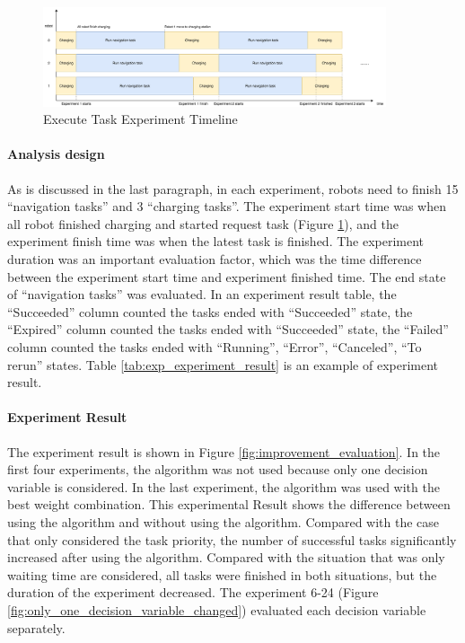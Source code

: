 \begin{figure}[htbp]
 \centering
 \includegraphics[width = 0.9\textwidth]{content/images/ch5/exe_exp_timeline.drawio.png}
 \caption{Execute Task Experiment Timeline}
 \label{fig:execute_task_experiment_timeline}
\end{figure}


\paragraph{Analysis design}
As is discussed in the last paragraph, in each experiment, robots need to finish 15 ``navigation tasks'' and 3 ``charging tasks''.
The experiment start time was when all robot finished charging and started request task (Figure \ref{fig:execute_task_experiment_timeline}), and the experiment finish time was when the latest task is finished.
The experiment duration was an important evaluation factor, which was the time difference between the experiment start time and experiment finished time. 
The end state of ``navigation tasks'' was evaluated. In an experiment result table, the ``Succeeded'' column counted the tasks ended with ``Succeeded'' state, the ``Expired'' column counted the tasks ended with ``Succeeded'' state, the ``Failed'' column counted the tasks ended with ``Running'', ``Error'', ``Canceled'', ``To rerun'' states. 
Table \ref{tab:exp_experiment_result} is an example of experiment result. 

\paragraph{Experiment Result} 
The experiment result is shown in Figure \ref{fig:improvement_evaluation}. In the first four experiments, the algorithm was not used because only one decision variable is considered. In the last experiment, the algorithm was used with the best weight combination.
 This experimental Result shows the difference between using the algorithm and without using the algorithm. Compared with the case that only considered the task priority, the number of successful tasks significantly increased after using the algorithm. Compared with the situation that was only waiting time are considered, all tasks were finished in both situations, but the duration of the experiment decreased. 
The experiment 6-24 (Figure \ref{fig:only_one_decision_variable_changed}) evaluated each decision variable separately.

